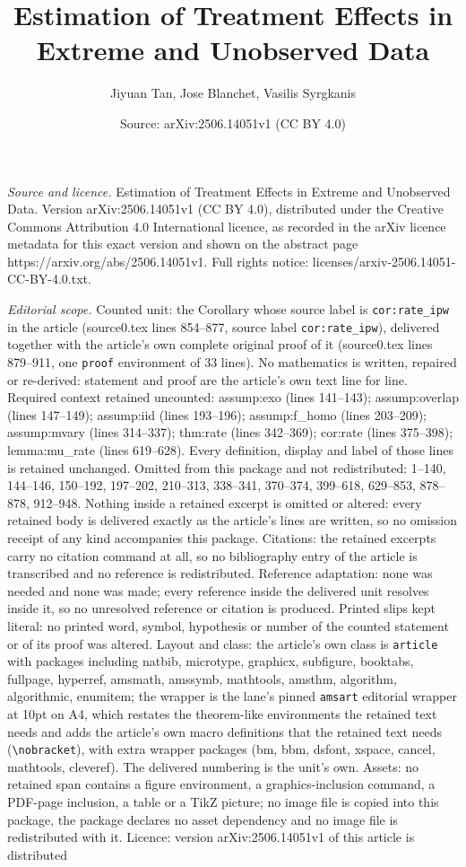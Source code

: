 \documentclass[10pt,a4paper]{amsart}
\title[Estimation of Treatment Effects in Extreme and Unobserved Da]{Estimation of Treatment Effects in Extreme and Unobserved Data}
\author{Jiyuan Tan, Jose Blanchet, Vasilis Syrgkanis}
\date{Source: arXiv:2506.14051v1 (CC BY 4.0)}
\begin{document}
\maketitle

\noindent\emph{Source and licence.} Estimation of Treatment Effects in Extreme and Unobserved Data. Version arXiv:2506.14051v1 (CC BY 4.0), distributed under the Creative Commons Attribution 4.0 International licence, as recorded in the arXiv licence metadata for this exact version and shown on the abstract page https://arxiv.org/abs/2506.14051v1. Full rights notice: licenses/arxiv-2506.14051-CC-BY-4.0.txt.\par\smallskip

\noindent\textit{Editorial scope.} Counted unit: the Corollary whose source label is \texttt{cor:rate\_ipw} in the article (source0.tex lines 854--877, source label \texttt{cor:rate\_ipw}), delivered together with the article's own complete original proof of it (source0.tex lines 879--911, one \texttt{proof} environment of 33 lines). No mathematics is written, repaired or re-derived: statement and proof are the article's own text line for line. Required context retained uncounted: assump:exo (lines 141--143); assump:overlap (lines 147--149); assump:iid (lines 193--196); assump:f\_homo (lines 203--209); assump:mvary (lines 314--337); thm:rate (lines 342--369); cor:rate (lines 375--398); lemma:mu\_rate (lines 619--628). Every definition, display and label of those lines is retained unchanged. Omitted from this package and not redistributed: 1--140, 144--146, 150--192, 197--202, 210--313, 338--341, 370--374, 399--618, 629--853, 878--878, 912--948. Nothing inside a retained excerpt is omitted or altered: every retained body is delivered exactly as the article's lines are written, so no omission receipt of any kind accompanies this package. Citations: the retained excerpts carry no citation command at all, so no bibliography entry of the article is transcribed and no reference is redistributed. Reference adaptation: none was needed and none was made; every reference inside the delivered unit resolves inside it, so no unresolved reference or citation is produced. Printed slips kept literal: no printed word, symbol, hypothesis or number of the counted statement or of its proof was altered. Layout and class: the article's own class is \texttt{article} with packages including natbib, microtype, graphicx, subfigure, booktabs, fullpage, hyperref, amsmath, amssymb, mathtools, amsthm, algorithm, algorithmic, enumitem; the wrapper is the lane's pinned \texttt{amsart} editorial wrapper at 10pt on A4, which restates the theorem-like environments the retained text needs and adds the article's own macro definitions that the retained text needs (\texttt{\textbackslash nobracket}), with extra wrapper packages (bm, bbm, dsfont, xspace, cancel, mathtools, cleveref). The delivered numbering is the unit's own. Assets: no retained span contains a figure environment, a graphics-inclusion command, a PDF-page inclusion, a table or a TikZ picture; no image file is copied into this package, the package declares no asset dependency and no image file is redistributed with it. Licence: version arXiv:2506.14051v1 of this article is distributed 
\end{document}
